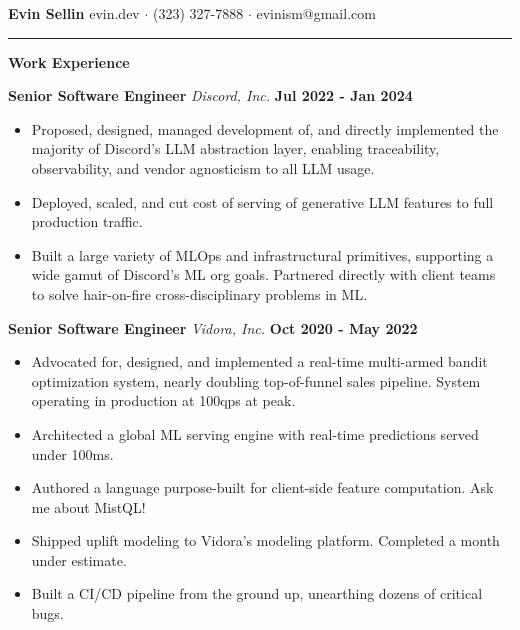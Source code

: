 \documentclass[10pt]{letter}
\begin{document}
\textbf{Evin Sellin}
\hfill
evin.dev $\cdot$ (323) 327-7888 $\cdot$ evinism@gmail.com
\vspace{4px}
\hrule
\textbf{Work Experience}

\hspace*{2px}
\textbf{Senior Software Engineer}
\textit{Discord, Inc.}
\hfill 
\textbf{Jul 2022 - Jan 2024}
\begin{itemize}
  \item Proposed, designed, managed development of, and directly implemented the majority of Discord's LLM abstraction layer, enabling traceability, observability, and vendor agnosticism to all LLM usage.
  \item Deployed, scaled, and cut cost of serving of generative LLM features to full production traffic.
  \item Built a large variety of MLOps and infrastructural primitives, supporting a wide gamut of Discord's ML org goals. Partnered directly with client teams to solve hair-on-fire cross-disciplinary problems in ML.
\end{itemize}

\hspace*{2px}
\textbf{Senior Software Engineer} 
\textit{Vidora, Inc.}
\hfill 
\textbf{Oct 2020 - May 2022}
\begin{itemize}
  \item Advocated for, designed, and implemented a real-time multi-armed bandit optimization system, nearly doubling top-of-funnel sales pipeline. System operating in production at 100qps at peak.
  \item Architected a global ML serving engine with real-time predictions served under 100ms.
  \item Authored a language purpose-built for client-side feature computation. Ask me about MistQL!
  \item Shipped uplift modeling to Vidora's modeling platform. Completed a month under estimate.
  \item Built a CI/CD pipeline from the ground up, unearthing dozens of critical bugs.
\end{itemize}
\end{document}
